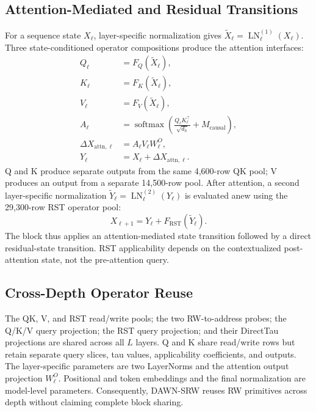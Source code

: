 \documentclass{article}
\newcommand{\DAWN}{DAWN-SRW}
\begin{document}
\subsection{Attention-Mediated and Residual Transitions}
\label{sec:block}

For a sequence state \(X_\ell\), layer-specific normalization gives
\(\widetilde X_\ell=\operatorname{LN}^{(1)}_\ell(X_\ell)\). Three
state-conditioned operator compositions produce the attention interfaces:
\begin{align}
Q_\ell&=F_Q(\widetilde X_\ell),\nonumber\\
K_\ell&=F_K(\widetilde X_\ell),\nonumber\\
V_\ell&=F_V(\widetilde X_\ell),\nonumber\\
A_\ell&=\operatorname{softmax}\!\left(
\frac{Q_\ell K_\ell^\top}{\sqrt{d_h}}+M_{\mathrm{causal}}\right)
\!,\nonumber\\
\Delta X_{\mathrm{attn},\ell}&=A_\ell V_\ell W^O_\ell,\\
Y_\ell&=X_\ell+\Delta X_{\mathrm{attn},\ell}.
\label{eq:attention}
\end{align}
Q and K produce separate outputs from the same 4,600-row QK pool; V produces an
output from a separate 14,500-row pool. After attention, a second layer-specific
normalization \(\widetilde Y_\ell=\operatorname{LN}^{(2)}_\ell(Y_\ell)\) is
evaluated anew using the 29,300-row RST operator pool:
\begin{equation}
X_{\ell+1}=Y_\ell+F_{\mathrm{RST}}(\widetilde Y_\ell).
\label{eq:rst}
\end{equation}
The block thus applies an attention-mediated state transition followed by a
direct residual-state transition. RST applicability depends on the
contextualized post-attention state, not the pre-attention query.

\subsection{Cross-Depth Operator Reuse}
\label{sec:reuse}

The QK, V, and RST read/write pools; the two RW-to-address probes; the Q/K/V
query projection; the RST query projection; and their DirectTau projections
are shared across all \(L\) layers. Q and K share read/write rows but retain
separate query slices, tau values, applicability coefficients, and outputs. The
layer-specific parameters are two LayerNorms and the attention output
projection \(W^O_\ell\). Positional and token embeddings and the final
normalization are model-level parameters. Consequently, \DAWN{} reuses
RW primitives across depth without claiming complete block sharing.
\end{document}

